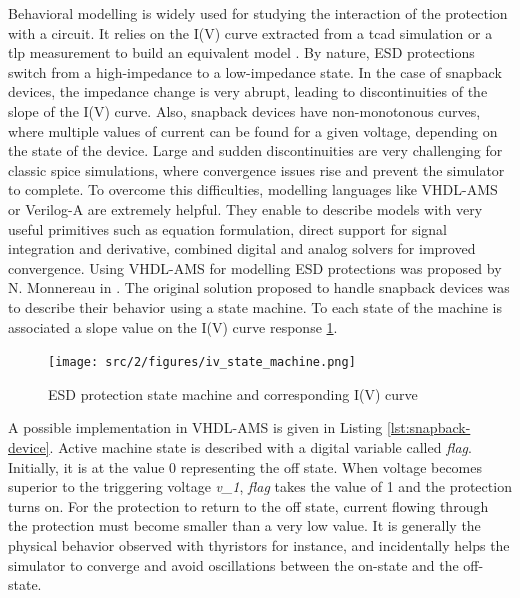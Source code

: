 Behavioral modelling is widely used for studying the interaction of the protection with a circuit.
It relies on the I(V) curve extracted from a \gls{tcad} simulation or a \gls{tlp} measurement to build an equivalent model \cite{modelling-diode-esd, esd-diode-compact-model, tvs-modeling}.
By nature, ESD protections switch from a high-impedance to a low-impedance state.
In the case of snapback devices, the impedance change is very abrupt, leading to discontinuities of the slope of the I(V) curve.
Also, snapback devices have non-monotonous curves, where multiple values of current can be found for a given voltage, depending on the state of the device.
Large and sudden discontinuities are very challenging for classic \gls{spice} simulations, where convergence issues rise and prevent the simulator to complete.
To overcome this difficulties, modelling languages like VHDL-AMS or Verilog-A are extremely helpful.
They enable to describe models with very useful primitives such as equation formulation, direct support for signal integration and derivative, combined digital and analog solvers for improved convergence.
Using VHDL-AMS for modelling ESD protections was proposed by N. Monnereau in \cite{phd-monnereau}.
The original solution proposed to handle snapback devices was to describe their behavior using a state machine.
To each state of the machine is associated a slope value on the I(V) curve response \ref{fig:esd-protection-state-machine}.

\begin{figure}[!h]
  \centering
  \texttt{[image: src/2/figures/iv\_state\_machine.png]}
  \caption{ESD protection state machine and corresponding I(V) curve}
  \label{fig:esd-protection-state-machine}
\end{figure}

A possible implementation in VHDL-AMS is given in Listing \ref{lst:snapback-device}.
Active machine state is described with a digital variable called \textit{flag}.
Initially, it is at the value 0 representing the off state.
When voltage becomes superior to the triggering voltage \textit{v\_1}, \textit{flag} takes the value of 1 and the protection turns on.
For the protection to return to the off state, current flowing through the protection must become smaller than a very low value.
It is generally the physical behavior observed with thyristors for instance, and incidentally helps the simulator to converge and avoid oscillations between the on-state and the off-state.

